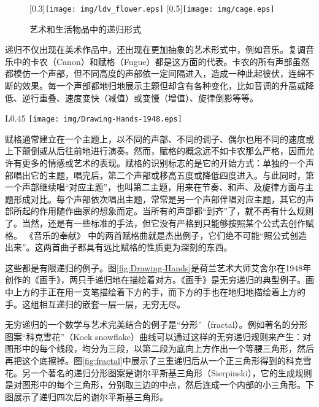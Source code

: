 \documentclass{article}
\begin{document}
\begin{figure}[htbp]
 \centering
 [0.3\linewidth]{\texttt{[image: img/ldv\_flower.eps]}} \quad
 [0.5\linewidth]{\texttt{[image: img/cage.eps]}}
 \caption{艺术和生活物品中的递归形式}
 \label{fig:flower}
\end{figure}

递归不仅出现在美术作品中，还出现在更加抽象的艺术形式中，例如音乐。复调音乐中的卡农（Canon）和赋格（Fugue）都是这方面的代表。卡农的所有声部虽然都模仿一个声部，但不同高度的声部依一定间隔进入，造成一种此起彼伏，连绵不断的效果。每一个声部都地归地展示主题但却含有各种变化，比如音调的升高或降低、逆行重叠、速度变快（减值）或变慢（增值）、旋律倒影等等。

\begin{wrapfigure}{L}{0.45\textwidth}
 \centering
 \texttt{[image: img/Drawing-Hands-1948.eps]}
 \caption{艾舍尔的作品《画手》，1948年}
 \label{fig:Drawing-Hands}
\end{wrapfigure}

赋格通常建立在一个主题上，以不同的声部、不同的调子、偶尔也用不同的速度或上下颠倒或从后往前地进行演奏。然而，赋格的概念远不如卡农那么严格，因而允许有更多的情感或艺术的表现。赋格的识别标志的是它的开始方式：单独的一个声部唱出它的主题，唱完后，第二个声部或移高五度或降低四度进入。与此同时，第一个声部继续唱“对应主题”，也叫第二主题，用来在节奏、和声、及旋律方面与主题形成对比。每个声部依次唱出主题，常常是另一个声部伴唱对应主题，其它的声部所起的作用随作曲家的想象而定。当所有的声部都“到齐”了，就不再有什么规则了。当然，还是有一些标准的手法，但它没有严格到只能够按照某个公式去创作赋格。 《音乐的奉献》 中的两首赋格曲就是杰出例子，它们绝不可能“照公式创造出来”。这两首曲子都具有远比赋格的性质更为深刻的东西\cite{GEB}。

这些都是有限递归的例子。图\ref{fig:Drawing-Hands}是荷兰艺术大师艾舍尔在1948年创作的《画手》，两只手递归地在描绘着对方。《画手》是无穷递归的典型例子。画中上方的手正在用一支笔描绘着下方的手，而下方的手也在地归地描绘着上方的手。这组相互递归的嵌套一层一层，无穷无尽。

无穷递归的一个数学与艺术完美结合的例子是“分形”（fractal）。例如著名的分形图案“科克雪花”（Kock snowflake）曲线可以通过这样的无穷递归规则来产生：对图形中的每个线段，均分为三段，以第二段为底向上方作出一个等腰三角形，然后再把这个底擦掉。图\ref{fig:fractal}中展示了三重递归后从一个正三角形得到的科克雪花。另一个著名的递归分形图案是谢尔平斯基三角形（Sierpinski），它的生成规则是对图形中的每个三角形，分别取三边的中点，然后连成一个内部的小三角形。下图展示了递归四次后的谢尔平斯基三角形。
\end{document}
